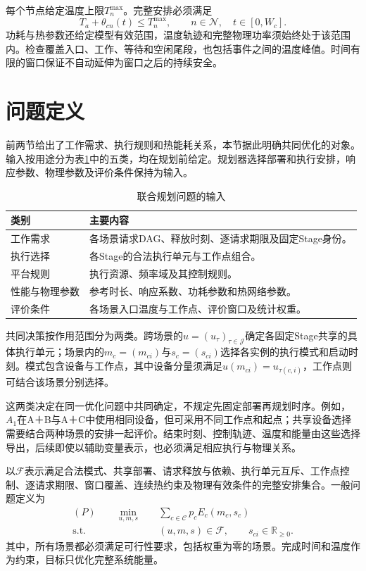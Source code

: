 每个节点给定温度上限\(T_n^{\max}\)。完整安排必须满足
\begin{equation}
T_a+\theta_{cn}(t)\le T_n^{\max},\qquad
n\in\mathcal N,\quad t\in[0,W_c].
\label{eq:continuous-temperature-limit}
\end{equation}
功耗与热参数还给定模型有效范围，温度轨迹和完整物理功率须始终处于该范围内。检查覆盖入口、工作、等待和空闲尾段，也包括事件之间的温度峰值。时间有限的窗口保证不自动延伸为窗口之后的持续安全。

\section{问题定义}

前两节给出了工作需求、执行规则和热能耗关系，本节据此明确共同优化的对象。输入按用途分为表\ref{tab:problem-inputs}中的五类，均在规划前给定。规划器选择部署和执行安排，响应参数、物理参数及评价条件保持为输入。

\begin{table}[htbp]
\centering
\caption{联合规划问题的输入}
\label{tab:problem-inputs}
\begin{tabular}{p{}p{}}
\toprule
类别 & 主要内容 \\
\midrule
工作需求 & 各场景请求DAG、释放时刻、逐请求期限及固定Stage身份。\\
执行选择 & 各Stage的合法执行单元与工作点组合。\\
平台规则 & 执行资源、频率域及其控制规则。\\
性能与物理参数 & 参考时长、响应系数、功耗参数和热网络参数。\\
评价条件 & 各场景入口温度与工作点、评价窗口及统计权重。\\
\bottomrule
\end{tabular}
\end{table}

共同决策按作用范围分为两类。跨场景的\(u=(u_\tau)_{\tau\in\mathcal J}\)确定各固定Stage共享的具体执行单元；场景内的\(m_c=(m_{ci})\)与\(s_c=(s_{ci})\)选择各实例的执行模式和启动时刻。模式包含设备与工作点，其中设备分量须满足\(u(m_{ci})=u_{\tau(c,i)}\)，工作点则可结合该场景分别选择。

这两类决定在同一优化问题中共同确定，不规定先固定部署再规划时序。例如，\(A_1\)在A＋B与A＋C中使用相同设备，但可采用不同工作点和起点；共享设备选择需要结合两种场景的安排一起评价。结束时刻、控制轨迹、温度和能量由这些选择导出，后续即使以辅助变量表示，也必须满足相应执行与物理关系。

以\(\mathcal F\)表示满足合法模式、共享部署、请求释放与依赖、执行单元互斥、工作点控制、逐请求期限、窗口覆盖、连续热约束及物理有效条件的完整安排集合。一般问题定义为
\begin{equation}
\begin{aligned}
(P)\qquad \min_{u,m,s}\quad &\sum_{c\in\mathcal C}p_cE_c(m_c,s_c)\\
\mathrm{s.t.}\quad &(u,m,s)\in\mathcal F,\qquad
s_{ci}\in\mathbb R_{\ge0}.
\end{aligned}
\label{eq:general-problem}
\end{equation}
其中，所有场景都必须满足可行性要求，包括权重为零的场景。完成时间和温度作为约束，目标只优化完整系统能量。

